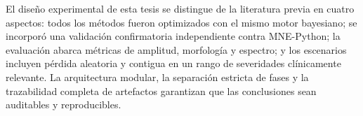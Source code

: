 El diseño experimental de esta tesis se distingue de la literatura previa en cuatro aspectos: todos los métodos fueron optimizados con el mismo motor bayesiano; se incorporó una validación confirmatoria independiente contra MNE-Python; la evaluación abarca métricas de amplitud, morfología y espectro; y los escenarios incluyen pérdida aleatoria y contigua en un rango de severidades clínicamente relevante. La arquitectura modular, la separación estricta de fases y la trazabilidad completa de artefactos garantizan que las conclusiones sean auditables y reproducibles.